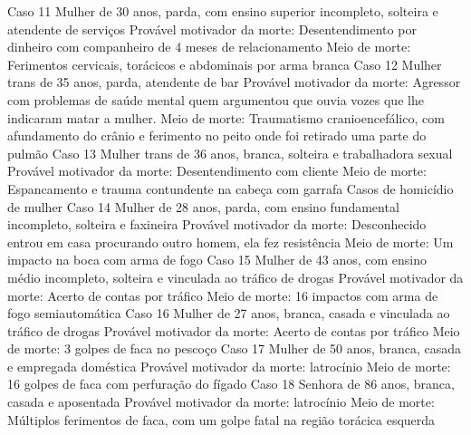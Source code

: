 Caso 11 
Mulher de 30 anos, parda, com ensino superior incompleto, solteira e atendente de serviços
Provável motivador da morte: Desentendimento por dinheiro com companheiro de 4 meses de relacionamento Meio de morte: Ferimentos cervicais, torácicos e abdominais por arma branca
Caso 12
Mulher trans de 35 anos, parda, atendente de bar
Provável motivador da morte: Agressor com problemas de saúde mental quem argumentou que ouvia vozes que lhe indicaram matar a mulher. Meio de morte: Traumatismo cranioencefálico, com afundamento do crânio e ferimento no peito onde foi retirado uma parte do pulmão
Caso 13
Mulher trans de 36 anos, branca, solteira e trabalhadora sexual
Provável motivador da morte: Desentendimento com cliente Meio de morte: Espancamento e trauma contundente na cabeça com garrafa
Casos de homicídio de mulher
Caso 14
Mulher de 28 anos, parda, com ensino fundamental incompleto, solteira e faxineira
Provável motivador da morte: Desconhecido entrou em casa procurando outro homem, ela fez resistência Meio de morte: Um impacto na boca com arma de fogo
Caso 15
Mulher de 43 anos, com ensino médio incompleto, solteira e vinculada ao tráfico de drogas
Provável motivador da morte: Acerto de contas por tráfico Meio de morte: 16 impactos com arma de fogo semiautomática
Caso 16
Mulher de 27 anos, branca, casada e vinculada ao tráfico de drogas
Provável motivador da morte: Acerto de contas por tráfico Meio de morte: 3 golpes de faca no pescoço
Caso 17
Mulher de 50 anos, branca, casada e empregada doméstica
Provável motivador da morte: latrocínio Meio de morte: 16 golpes de faca com perfuração do fígado
Caso 18
Senhora de 86 anos, branca, casada e aposentada
Provável motivador da morte: latrocínio Meio de morte: Múltiplos ferimentos de faca, com um golpe fatal na região torácica esquerda

